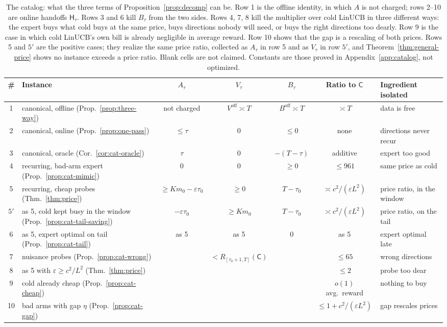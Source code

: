 \documentclass{article}
\theoremstyle{definition}
\theoremstyle{remark}
\newcommand{\eps}{\varepsilon}
\theoremstyle{remark}
\newcommand{\Cold}{\mathsf{C}}
\newcommand{\Hyb}{\mathsf{H}}
\begin{document}
\begin{table}[t]
\centering
\scriptsize
\setlength{\tabcolsep}{2.5pt}
\begin{tabular}{@{}clccccl@{}}
\toprule
\# & Instance & $A_\tau$ & $V_\tau$ & $B_\tau$ & Ratio to $\Cold$ & Ingredient isolated\\
\midrule
1 & canonical, offline (Prop.~\ref{prop:three-way}) & not charged & $V^{\mathrm{off}}\asymp T$ & $B^{\mathrm{off}}\asymp T$ & $\asymp T$ & data is free\\
2 & canonical, online (Prop.~\ref{prop:one-pass}) & $\le\tau$ & $0$ & $\le0$ & none & directions never recur\\
3 & canonical, oracle (Cor.~\ref{cor:cat-oracle}) & $\tau$ & $0$ & $-(T-\tau)$ & additive & expert too good\\
4 & recurring, bad-arm expert (Prop.~\ref{prop:cat-mimic}) & $0$ & $0$ & $\ge0$ & $\le961$ & same price as cold\\
5 & recurring, cheap probes (Thm.~\ref{thm:price}) & $\ge Km_0-\eps\tau_0$ & $\ge0$ & $T-\tau_0$ & $\asymp c^2/(\eps L^2)$ & price ratio, in the window\\
$5'$ & as 5, cold kept busy in the window (Prop.~\ref{prop:cat-tail-saving}) & $-\eps\tau_0$ & $\ge Km_0$ & $T-\tau_0$ & $\asymp c^2/(\eps L^2)$ & price ratio, on the tail\\
6 & as 5, expert optimal on tail (Prop.~\ref{prop:cat-tail}) & as 5 & as 5 & $0$ & as 5 & expert optimal late\\
7 & nuisance probes (Prop.~\ref{prop:cat-wrong}) & & $<R_{[\tau_0+1,T]}(\Cold)$ & & $\le65$ & wrong directions\\
8 & as 5 with $\eps\ge c^2/L^2$ (Thm.~\ref{thm:price}) & & & & $\le2$ & probe too dear\\
9 & cold already cheap (Prop.~\ref{prop:cat-cheap}) & & & & $o(1)$ avg.\ reward & nothing to buy\\
10 & bad arms with gap $\eta$ (Prop.~\ref{prop:cat-gap}) & & & & $\le1+c^2/(\eps L^2)$ & gap rescales prices\\
\bottomrule
\end{tabular}
\caption{The catalog: what the three terms of Proposition~\ref{prop:decomp} can be.
Row 1 is the offline identity, in which $A$ is not charged; rows 2--10 are
online handoffs $\Hyb_\tau$. Rows 3 and 6 kill $B_\tau$ from the two sides.
Rows 4, 7, 8 kill the multiplier over cold LinUCB in three different ways:
the expert buys what cold buys at the same price, buys directions nobody will
need, or buys the right directions too dearly. Row 9 is the case in which cold
LinUCB's own bill is already negligible in average reward. Row 10 shows that
the gap is a rescaling of both prices. Rows 5 and $5'$ are the positive
cases; they realize the same price ratio, collected as $A_\tau$ in row 5 and
as $V_\tau$ in row $5'$, and Theorem~\ref{thm:general-price} shows no
instance exceeds a price ratio. Blank cells are not claimed. Constants are
those proved in Appendix~\ref{app:catalog}, not optimized.}
\label{tab:catalog}
\end{table}
\end{document}
